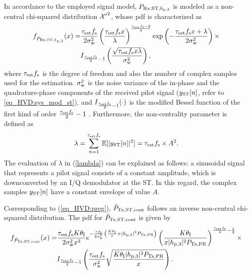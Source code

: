 In accordance to the employed signal model, $P_{\text{Rx,ST,$h_{\text{p,3}}$}}$ is modeled as a non-central chi-squared distribution $\ncchi2$, whose pdf is characterized as \cite{Char99}
\begin{align}
	\label{eq_HVD:dprcvdstpr}
	f_{\hat{P}_{\text{Rx,ST,$h_{\text{p,3}}$}}} (x) =& 
	\frac{\tau_{\text{est}} f_{\text{s}}}{2\sigma^2_{\text{w}}} \left(\frac{\tau_{\text{est}} f_{\text{s}} x}{\lambda}\right)^\frac{\tau_{\text{est}} f_{\text{s}}-2}{4} \exp\left(-\frac{\tau_{\text{est}} f_{\text{s}} x+\lambda}{2\sigma^2_{\text{w}}}\right)  \times \\ 
	\quad & I_{ \frac{\tau_{\text{est}} f_{\text{s}}}{2}-1 }\left(\frac{\sqrt{\tau_{\text{est}} f_{\text{s}} x \lambda}}{\sigma^2_{\text{w}}}\right) \nonumber  ,
\end{align}
where $\tau_{\text{est}} f_{\text{s}}$ is the degree of freedom and also the number of complex samples used for the estimation. $\sigma^2_{\text{w}}$ is the noise variance of the in-phase and the quadrature-phase components of the received pilot signal ($y_{\text{ST}}[n]$, refer to \ref{eq_HVD:sys_mod_st}), and $I_{\frac{\tau_{\text{est}} f_{\text{s}}}{2}-1}(\cdot)$ is the modified Bessel function of the first kind of order $\frac{\tau_{\text{est}} f_{\text{s}}}{2}-1$ \cite{Jef00}. Furthermore, the non-centrality parameter is defined as
\begin{equation}
	\label{lambda}
	\lambda = \sum_{n=1}^{\tau_{\text{est}} f_{\text{s}}} \mathbb{E}[|y_{\text{ST}}[n]|^2] = \tau_{\text{est}} f_{\text{s}} \times A^2.
\end{equation}
The evaluation of $\lambda$ in (\ref{lambda}) can be explained as follows: a sinusoidal signal that represents a pilot signal consists of a constant amplitude, which is downconverted by an I/Q demodulator at the ST. In this regard, the complex samples $y_{\text{ST}}[n]$ have a constant envelope of value $A$. 

Corresponding to (\ref{eq_HVD:preg}), $\hat{P}_{\text{Tx,ST,cont}}$ follows an inverse non-central chi-squared distribution. The pdf for $\hat{P}_{\text{Tx,ST,cont}}$  is given by
\begin{align}
f_{\hat{P}_{\text{Tx,ST,cont}}}(x) =& \frac{\tau_{\text{est}} f_{\text{s}} K \theta_{\text{I}}}{2\sigma^2_{\text{w}} x^2} e^{- \frac{\tau f_{\text{s}}}{2 \sigma^2_{\text{w}}}\left( \frac{K  \theta_{\text{I}}}{x} + |h_{\text{p,3}}|^2 P_{\text{Tx,PR}} \right)} \left( \frac{K \theta_{\text{I}}}{x |h_{\text{p,3}}|^2 P_{\text{Tx,PR}}}   \right)^{\frac{\tau_{\text{est}} f_{\text{s}}}{4} - \frac{1}{2}} \label{eq_HVD:dpreg} \times \\
\quad & I_{\frac{\tau_{\text{est}} f_{\text{s}}}{2}  - 1}\left( \frac{\tau_{\text{est}} f_{\text{s}}}{\sigma^2_{\text{w}}} \sqrt{\frac{ K \theta_{\text{I}} |h_{\text{p,3}}|^2 P_{\text{Tx,PR}}}{x}}  \right). \nonumber
\end{align}

